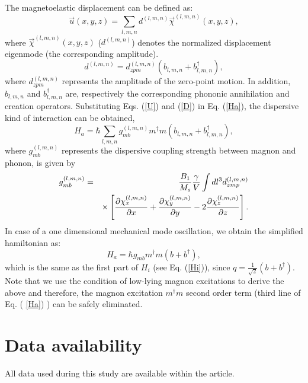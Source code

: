 \documentclass[aps,pra,superscriptaddress,balancelastpage,twocolumn]{revtex4}
\begin{document}
The magnetoelastic displacement can be defined as:
\begin{equation}
\vec{u}\left( x,y,z\right) =\sum\limits_{l,m,n}d^{(l,m,n)}\vec{\chi}%
^{(l,m,n)}\left( x,y,z\right) ,  \label{U}
\end{equation}%
where $\vec{\chi}^{(l,m,n)}\left( x,y,z\right) $ ($d^{(l,m,n)}$) denotes the
normalized displacement eigenmode (the corresponding amplitude).
\begin{equation}
d^{(l,m,n)}=d_{zpm}^{(l,m,n)}\left( b_{l,m,n}+b_{l,m,n}^{\dagger }\right) ,
\label{D}
\end{equation}%
where $d_{zpm}^{(l,m,n)}$ represents the amplitude of the zero-point motion.
In addition, $b_{l,m,n}$ and $b_{l,m,n}^{\dagger }$ are, respectively the
corresponding phononic annihilation and creation operators. Substituting
Eqs. (\ref{U}) and (\ref{D}) in Eq. (\ref{Ha}), the dispersive kind of
interaction can be obtained,
\begin{equation}
H_{a}=\hbar \sum\limits_{l,m,n}g_{mb}^{(l,m,n)}m^{\dagger }m\left(
b_{l,m,n}+b_{l,m,n}^{\dagger }\right) ,
\end{equation}%
where $g_{mb}^{(l,m,n)}$ represents the dispersive coupling strength between
magnon and phonon, is given by
\begin{eqnarray}
g_{mb}^{(l,m,n)} &=&\frac{B_{1}}{M_{s}}\frac{\gamma }{V}\int
dl^{3}d_{zmp}^{(l,m,n)}  \notag \\
&&\times \left[ \frac{\partial \chi _{x}^{(l,m,n)}}{\partial x}+\frac{%
\partial \chi _{y}^{(l,m,n)}}{\partial y}-2\frac{\partial \chi _{z}^{(l,m,n)}%
}{\partial z}\right] .
\end{eqnarray}%
In case of a one dimensional mechanical mode oscillation, we obtain the
simplified hamiltonian as:
\begin{equation}
H_{a}=\hbar g_{mb}m^{\dagger }m\left( b+b^{\dagger }\right) ,
\end{equation}%
which is the same as the first part of $H_{i}$ (see Eq. (\ref{Hi})), since $%
q=\frac{1}{\sqrt{2}}\left( b+b^{\dagger }\right) $. Note that we use the
condition of low-lying magnon excitations to derive the above and therefore,
the magnon excitation $m^{\dagger }m$ second order term (third line of Eq. (%
\ref{Ha}) ) can be safely eliminated.

\section*{Data availability}

All data used during this study are available within the article.
\end{document}
